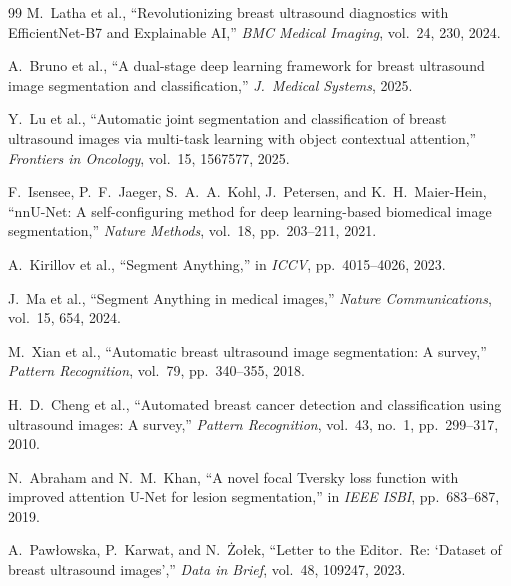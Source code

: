 \documentclass[10pt,twocolumn]{article}
\begin{document}
\begin{thebibliography}{99}
M.~Latha et al., ``Revolutionizing breast ultrasound diagnostics with
EfficientNet-B7 and Explainable AI,'' \emph{BMC Medical Imaging}, vol.~24, 230,
2024.

A.~Bruno et al., ``A dual-stage deep learning framework for breast ultrasound
image segmentation and classification,'' \emph{J.\ Medical Systems}, 2025.

Y.~Lu et al., ``Automatic joint segmentation and classification of breast
ultrasound images via multi-task learning with object contextual attention,''
\emph{Frontiers in Oncology}, vol.~15, 1567577, 2025.

F.~Isensee, P.~F.~Jaeger, S.~A.~A.~Kohl, J.~Petersen, and K.~H.~Maier-Hein,
``nnU-Net: A self-configuring method for deep learning-based biomedical image
segmentation,'' \emph{Nature Methods}, vol.~18, pp.~203--211, 2021.

A.~Kirillov et al., ``Segment Anything,'' in \emph{ICCV}, pp.~4015--4026, 2023.

J.~Ma et al., ``Segment Anything in medical images,'' \emph{Nature
Communications}, vol.~15, 654, 2024.

M.~Xian et al., ``Automatic breast ultrasound image segmentation: A survey,''
\emph{Pattern Recognition}, vol.~79, pp.~340--355, 2018.

H.~D.~Cheng et al., ``Automated breast cancer detection and classification using
ultrasound images: A survey,'' \emph{Pattern Recognition}, vol.~43, no.~1,
pp.~299--317, 2010.

N.~Abraham and N.~M.~Khan, ``A novel focal Tversky loss function with improved
attention U-Net for lesion segmentation,'' in \emph{IEEE ISBI}, pp.~683--687,
2019.

A.~Paw{\l}owska, P.~Karwat, and N.~{\.Z}o{\l}ek, ``Letter to the Editor.\ Re:
`Dataset of breast ultrasound images','' \emph{Data in Brief}, vol.~48, 109247,
2023.

\end{thebibliography}
\endgroup
\end{document}
